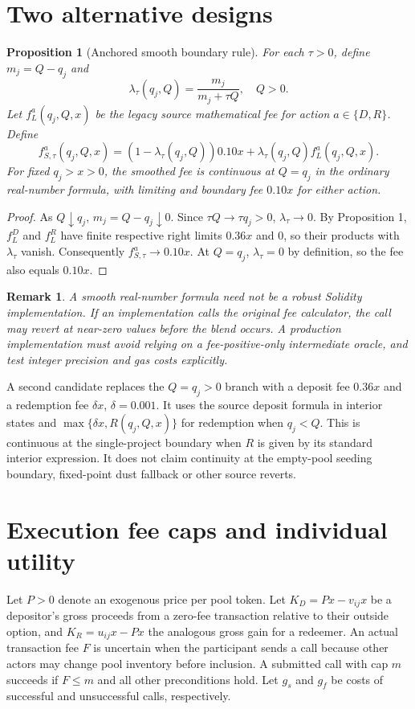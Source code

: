 \documentclass[11pt]{article}
\newtheorem{proposition}{Proposition}
\newtheorem{remark}{Remark}
\begin{document}
\section{Two alternative designs}
\begin{proposition}[Anchored smooth boundary rule]
For each $\tau>0$, define $m_j=Q-q_j$ and
\[
\lambda_\tau(q_j,Q)=\frac{m_j}{m_j+\tau Q},\quad Q>0.
\]
Let $f_L^a(q_j,Q,x)$ be the legacy source mathematical fee for action $a\in\{D,R\}$. Define
\[
f_{S,\tau}^a(q_j,Q,x)=\left(1-\lambda_\tau(q_j,Q)\right)0.10x+\lambda_\tau(q_j,Q)f_L^a(q_j,Q,x).
\]
For fixed $q_j>x>0$, the smoothed fee is continuous at $Q=q_j$ in the ordinary real-number formula, with limiting and boundary fee $0.10x$ for either action.
\end{proposition}
\begin{proof}
As $Q\downarrow q_j$, $m_j=Q-q_j\downarrow0$. Since $\tau Q\to\tau q_j>0$, $\lambda_\tau\to0$. By Proposition 1, $f_L^D$ and $f_L^R$ have finite respective right limits $0.36x$ and $0$, so their products with $\lambda_\tau$ vanish. Consequently $f_{S,\tau}^a\to0.10x$. At $Q=q_j$, $\lambda_\tau=0$ by definition, so the fee also equals $0.10x$.
\end{proof}

\begin{remark}
A smooth real-number formula need not be a robust Solidity implementation. If an implementation calls the original fee calculator, the call may revert at near-zero values before the blend occurs. A production implementation must avoid relying on a fee-positive-only intermediate oracle, and test integer precision and gas costs explicitly.
\end{remark}

A second candidate replaces the $Q=q_j>0$ branch with a deposit fee $0.36x$ and a redemption fee $\delta x$, $\delta=0.001$. It uses the source deposit formula in interior states and $\max\{\delta x,R(q_j,Q,x)\}$ for redemption when $q_j<Q$. This is continuous at the single-project boundary when $R$ is given by its standard interior expression. It does not claim continuity at the empty-pool seeding boundary, fixed-point dust fallback or other source reverts.

\section{Execution fee caps and individual utility}
Let $P>0$ denote an exogenous price per pool token. Let $K_D=Px-v_{ij}x$ be a depositor's gross proceeds from a zero-fee transaction relative to their outside option, and $K_R=u_{ij}x-Px$ the analogous gross gain for a redeemer. An actual transaction fee $F$ is uncertain when the participant sends a call because other actors may change pool inventory before inclusion. A submitted call with cap $m$ succeeds if $F\leq m$ and all other preconditions hold. Let $g_s$ and $g_f$ be costs of successful and unsuccessful calls, respectively.
\end{document}

